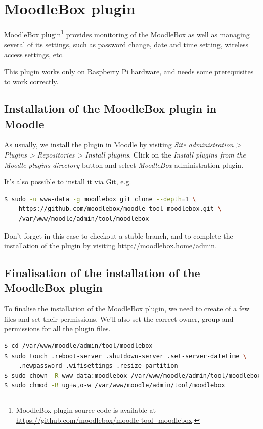 \documentclass[12pt]{article}
\begin{document}

\section{MoodleBox plugin}

MoodleBox plugin\footnote{MoodleBox plugin source code is available at \url{https://github.com/moodlebox/moodle-tool_moodlebox}.} provides monitoring of the MoodleBox as well as managing several of its settings, such as password change, date and time setting, wireless access settings, etc.

This plugin works only on Raspberry Pi hardware, and needs some prerequisites to work correctly.

\subsection{Installation of the MoodleBox plugin in Moodle}

As usually, we install the plugin in Moodle by visiting \emph{Site administration > Plugins > Repositories > Install plugins}.
Click on the \emph{Install plugins from the Moodle plugins directory} button and select \emph{MoodleBox} administration plugin.

It's also possible to install it via Git, e.g.

\begin{lstlisting}[language=bash]
$ sudo -u www-data -g moodlebox git clone --depth=1 \
    https://github.com/moodlebox/moodle-tool_moodlebox.git \
    /var/www/moodle/admin/tool/moodlebox
\end{lstlisting}

Don't forget in this case to checkout a stable branch, and to complete the installation of the plugin by visiting \url{http://moodlebox.home/admin}.

\subsection{Finalisation of the installation of the MoodleBox plugin}

To finalise the installation of the MoodleBox plugin, we need to create of a few files and set their permissions.
We'll also set the correct owner, group and permissions for all the plugin files.
\begin{lstlisting}[language=bash]
$ cd /var/www/moodle/admin/tool/moodlebox
$ sudo touch .reboot-server .shutdown-server .set-server-datetime \
    .newpassword .wifisettings .resize-partition
$ sudo chown -R www-data:moodlebox /var/www/moodle/admin/tool/moodlebox
$ sudo chmod -R ug+w,o-w /var/www/moodle/admin/tool/moodlebox
\end{lstlisting}
\end{document}
